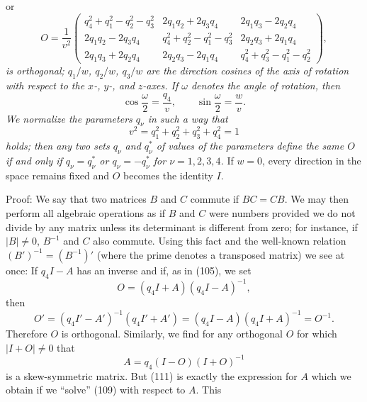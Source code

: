 or
\begin{equation}\tag{106}
O=\frac1{v^2}\begin{pmatrix}
q_4^2+q_1^2-q_2^2-q_3^2 & 2q_1q_2+2q_3q_4 & 2q_1q_3-2q_2q_4\\
2q_1q_2-2q_3q_4 & q_4^2+q_2^2-q_1^2-q_3^2 & 2q_2q_3+2q_1q_4\\
2q_1q_3+2q_2q_4 & 2q_2q_3-2q_1q_4 & q_4^2+q_3^2-q_1^2-q_2^2
\end{pmatrix},
\end{equation}
\emph{is orthogonal; $q_1/w$, $q_2/w$, $q_3/w$ are the direction cosines of the axis of rotation with respect to the $x$-, $y$-, and $z$-axes. If $\omega$ denotes the angle of rotation, then}
\begin{equation}\tag{107}
\cos\frac\omega2=\frac{q_4}{v},\qquad \sin\frac\omega2=\frac{w}{v}.
\end{equation}
\emph{We normalize the parameters $q_\nu$ in such a way that}
\begin{equation}\tag{108}
v^2=q_1^2+q_2^2+q_3^2+q_4^2=1
\end{equation}
\emph{holds; then any two sets $q_\nu$ and $q_\nu^*$ of values of the parameters define the same $O$ if and only if $q_\nu=q_\nu^*$ or $q_\nu=-q_\nu^*$ for $\nu=1,2,3,4$.} If $w=0$, every direction in the space remains fixed and $O$ becomes the identity $I$.

Proof: We say that two matrices $B$ and $C$ commute if $BC=CB$. We may then perform all algebraic operations as if $B$ and $C$ were numbers provided we do not divide by any matrix unless its determinant is different from zero; for instance, if $|B|\ne0$, $B^{-1}$ and $C$ also commute. Using this fact and the well-known relation $(B')^{-1}=(B^{-1})'$ (where the prime denotes a transposed matrix) we see at once: If $q_4I-A$ has an inverse and if, as in (105), we set
\begin{equation}\tag{109}
O=(q_4I+A)(q_4I-A)^{-1},
\end{equation}
then
\begin{equation}\tag{110}
O'=(q_4I'-A')^{-1}(q_4I'+A')=(q_4I-A)(q_4I+A)^{-1}=O^{-1}.
\end{equation}
Therefore $O$ is orthogonal. Similarly, we find for any orthogonal $O$ for which $|I+O|\ne0$ that
\begin{equation}\tag{111}
A=q_4(I-O)(I+O)^{-1}
\end{equation}
is a skew-symmetric matrix. But (111) is exactly the expression for $A$ which we obtain if we ``solve'' (109) with respect to $A$. This

